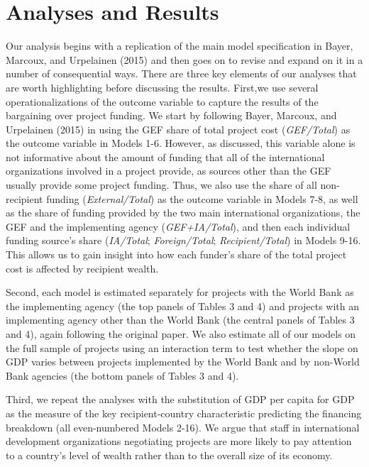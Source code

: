 \documentclass{article}
\begin{document}
\section{Analyses and Results}
Our analysis begins with a replication of the main model specification in Bayer, Marcoux, and Urpelainen (2015) and then goes on to revise and expand on it in a number of consequential ways.  There are three key elements of our analyses that are worth highlighting before discussing the results.  First,we use several operationalizations of the outcome variable to capture the results of the bargaining over project funding.  We start by following Bayer, Marcoux, and Urpelainen (2015) in using the GEF share of total project cost (\textit{GEF/Total}) as the outcome variable in Models 1-6.  However, as discussed, this variable alone is not informative about the amount of funding that all of the international organizations involved in a project provide, as sources other than the GEF usually provide some project funding.  Thus, we also use the share of all non-recipient funding (\textit{External/Total}) as the outcome variable in Models 7-8, as well as the share of funding provided by the two main international organizations, the GEF and the implementing agency (\textit{GEF+IA/Total}), and then each individual funding source’s share (\textit{IA/Total}; \textit{Foreign/Total}; \textit{Recipient/Total}) in Models 9-16.  This allows us to gain insight into how each funder’s share of the total project cost is affected by recipient wealth. 

Second, each model is estimated separately for projects with the World Bank as the implementing agency (the top panels of Tables 3 and 4) and projects with an implementing agency other than the World Bank (the central panels of Tables 3 and 4), again following the original paper.  We also estimate all of our models on the full sample of projects using an interaction term to test whether the slope on GDP varies between projects implemented by the World Bank and by non-World Bank agencies (the bottom panels of Tables 3 and 4).  

Third, we repeat the analyses with the substitution of GDP per capita for GDP as the measure of the key recipient-country characteristic predicting the financing breakdown (all even-numbered Models 2-16).  We argue that staff in international development organizations negotiating projects are more likely to pay attention to a country’s level of wealth rather than to the overall size of its economy. 
\end{document}
